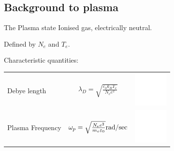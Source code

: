 \documentclass[dvipsnames]{beamer}
\begin{document}
\subsection{Background to plasma}
\begin{frame}{The Plasma state}
Ionised gas, electrically neutral.

Defined by $N_e$ and $T_e$.

Characteristic quantities:
  \begin{tabular}{l c r}
  Debye length & $\lambda_D=\sqrt{\frac{\varepsilon_0 k_B T_e}{N_e e^2}}$ &  \includegraphics[height=50pt]{figures/theory/white_background.png}\\ 
  Plasma Frequency & $ \omega_p=\sqrt{\frac{N_e e^2}{m_e \varepsilon_0}}\si[per-mode=fraction]{\radian\per\sec} $ & \includegraphics[height=50pt]{figures/theory/white_background.png}\\
  \end{tabular}
\end{frame}
\end{document}
